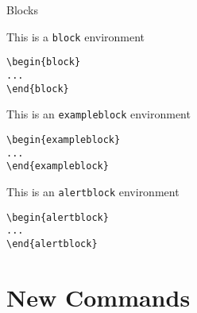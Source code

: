 \documentclass[presentation,apice]{beamer}\mode<presentation>{\usetheme{AMSBolognaFC}}
\begin{document}
\begin{frame}[c,fragile]{Blocks}
%
\begin{block}{This is a \texttt{block} environment}
\begin{verbatim}
\begin{block}
...
\end{block}
\end{verbatim}
\end{block}
%
\begin{exampleblock}{This is an \texttt{exampleblock} environment}
\begin{verbatim}
\begin{exampleblock}
...
\end{exampleblock}
\end{verbatim}
\end{exampleblock}
%
\begin{alertblock}{This is an \texttt{alertblock} environment}
\begin{verbatim}
\begin{alertblock}
...
\end{alertblock}
\end{verbatim}
\end{alertblock}
%
\end{frame}

\section{New Commands}
\end{document}
